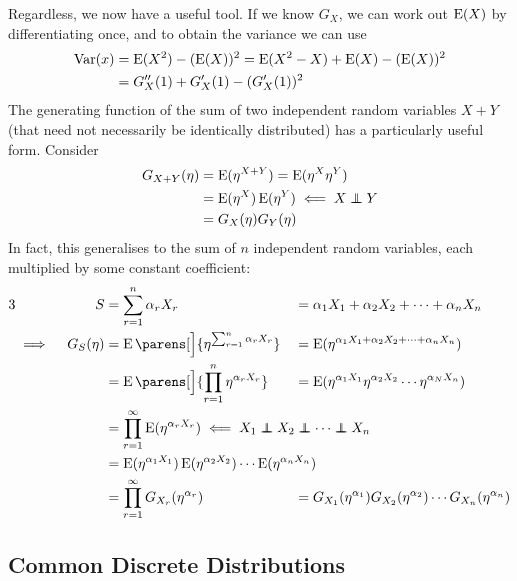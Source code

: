 Regardless, we now have a useful tool. If we know \(G_X\), we can work out
\(\operatorname{E}(X)\) by differentiating once, and to obtain the variance we can use
\begin{align*}
 \operatorname{Var}(x) &= \operatorname{E}(X^2) - (\operatorname{E}(X))^2
     = \operatorname{E}(X^2 - X) + \operatorname{E}(X) - (\operatorname{E}(X))^2 \\
     &= G_X''(1) + G_X'(1) - (G_X'(1))^2
\end{align*}
The generating function of the sum of two independent random variables \(X + Y\)
(that need not necessarily be identically distributed) has a particularly useful
form. Consider
\begin{align*}
 G_{X+Y}(\eta) &= \Expect(\eta^{X + Y}) = \Expect(\eta^X \eta^Y) \\
     &= \Expect(\eta^X) \Expect(\eta^Y) \impliedby X \independent Y \\
     &= G_X(\eta) G_Y(\eta)
\end{align*}
In fact, this generalises to the sum of \(n\) independent random variables, each
multiplied by some constant coefficient:
\begin{alignat*} 3
 && S &= \sum_{r = 1}^n \alpha_r X_r
 &&= \alpha_1 X_1 + \alpha_2 X_2 + \dotsb + \alpha_n X_n \\
 &\implies{}& G_S(\eta)
     &= \Expect\parens[\Big]{\eta^{\sum_{r = 1}^n \alpha_r X_r}}
 &&= \Expect(\eta^{\alpha_1 X_1 + \alpha_2 X_2 + \dotsb + \alpha_n X_n}) \\
 && &= \Expect\parens[\Big]{\prod_{r = 1}^n \eta^{\alpha_r X_r}}
 &&= \Expect(\eta^{\alpha_1 X_1} \eta^{\alpha_2 X_2} \dotsm
           \eta^{\alpha_N X_n}) \\
 && &= \prod_{r = 1}^\infty\Expect(\eta^{\alpha_r X_r})
  \mathrlap{
   {}\impliedby X_1 \independent X_2 \independent
                          \dotsb \independent X_n} \\
 && &= \mathrlap{
     \Expect(\eta^{\alpha_1 X_1}) \Expect(\eta^{\alpha_2 X_2}) \dotsm
     \Expect(\eta^{\alpha_n X_n})} \\
 && &= \prod_{r = 1}^\infty G_{X_r}(\eta^{\alpha_r})
 &&= G_{X_1}(\eta^{\alpha_1}) G_{X_2}(\eta^{\alpha_2}) \dotsm
     G_{X_n}(\eta^{\alpha_n})
\end{alignat*}

\subsection{Common Discrete Distributions}

